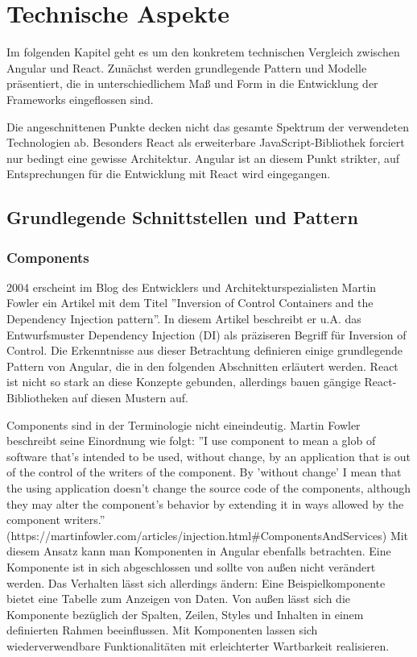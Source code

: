 \chapter{Technische Aspekte}
Im folgenden Kapitel geht es um den konkretem technischen Vergleich zwischen Angular und React. Zunächst werden grundlegende Pattern und Modelle präsentiert, die in unterschiedlichem Maß und Form in die Entwicklung der Frameworks eingeflossen sind.

Die angeschnittenen Punkte decken nicht das gesamte Spektrum der verwendeten Technologien ab. Besonders React als erweiterbare JavaScript-Bibliothek forciert nur bedingt eine gewisse Architektur. Angular ist an diesem Punkt strikter, auf Entsprechungen für die Entwicklung mit React wird eingegangen.
\section{Grundlegende Schnittstellen und Pattern}
\subsection{Components}
2004 erscheint im Blog des Entwicklers und Architekturspezialisten Martin Fowler ein Artikel mit dem Titel ''Inversion of Control Containers and the Dependency Injection pattern''. In diesem Artikel beschreibt er u.A. das Entwurfsmuster Dependency Injection (DI) als präziseren Begriff für Inversion of Control. Die Erkenntnisse aus dieser Betrachtung definieren einige grundlegende Pattern von Angular, die in den folgenden Abschnitten erläutert werden. React ist nicht so stark an diese Konzepte gebunden, allerdings bauen gängige React-Bibliotheken auf diesen Mustern auf.

Components sind in der Terminologie nicht eineindeutig. Martin Fowler beschreibt seine Einordnung wie folgt: ''I use component to mean a glob of software that's intended to be used, without change, by an application that is out of the control of the writers of the component. By 'without change' I mean that the using application doesn't change the source code of the components, although they may alter the component's behavior by extending it in ways allowed by the component writers.''
(https://martinfowler.com/articles/injection.html\#ComponentsAndServices)
Mit diesem Ansatz kann man Komponenten in Angular ebenfalls betrachten. Eine Komponente ist in sich abgeschlossen und sollte von außen nicht verändert werden. Das Verhalten lässt sich allerdings ändern: Eine Beispielkomponente bietet eine Tabelle zum Anzeigen von Daten. Von außen lässt sich die Komponente bezüglich der Spalten, Zeilen, Styles und Inhalten in einem definierten Rahmen beeinflussen. Mit Komponenten lassen sich wiederverwendbare Funktionalitäten mit erleichterter Wartbarkeit realisieren.

